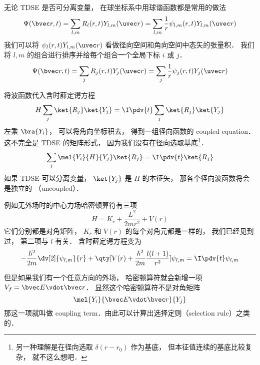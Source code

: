 

无论 TDSE 是否可分离变量， 在球坐标系中用球谐函数都是常用的做法
\begin{equation}\label{RYTDSE_eq1}
\Psi(\bvec r, t) = \sum_{l,m} R_l (r, t) Y_{l,m} (\uvec r) = \sum_{l,m} \frac{1}{r} \psi_{l,m} (r, t) Y_{l,m} (\uvec r)
\end{equation}
我们可以将 $\psi_l (r, t) Y_{l,m} (\uvec r)$ 看做径向空间和角向空间中态矢的张量积． 我们将 $l, m$ 的组合进行排序并给每个组合一个全局下标 $i$ 或 $j$．
\begin{equation}
\Psi(\bvec r, t) = \sum_j R_j (r, t) Y_j (\uvec r) = \sum_j \frac{1}{r} \psi_j (r, t) Y_j (\uvec r)
\end{equation}

将波函数代入含时薛定谔方程
\begin{equation}
H \sum_j\ket{R_j}\ket{Y_j} = \I \pdv{t}  \sum_j\ket{R_j}\ket{Y_j}
\end{equation}
左乘 $\bra{Y_i}$， 可以将角向坐标积去， 得到一组径向函数的 coupled equation． 这不完全是 TDSE 的矩阵形式， 因为我们没有在径向选取基底\footnote{另一种理解是在径向选取 $\delta(r - r_0)$ 作为基底， 但本征值连续的基底比较复杂， 就不这么想吧．}．
\begin{equation}
\sum_j \mel{Y_i}{H}{Y_j} \ket{R_j} = \I \pdv{t} \ket{R_j}
\end{equation}
如果 TDSE 可以分离变量， $\ket{Y_j}$ 是 $H$ 的本征矢， 那各个径向波函数将会是独立的 （uncoupled）．

例如无外场时的中心力场哈密顿算符有三项
\begin{equation}
H = K_r + \frac{L^2}{2mr^2} + V(r)
\end{equation}
它们分别都是对角矩阵， $K_r$ 和 $V(r)$ 的每个对角元都是一样的， 我们已经见到过， 第二项与 $l$ 有关． 含时薛定谔方程变为
\begin{equation}
-\frac{\hbar^2}{2m} \dv[2]{\psi_{l,m}}{r} + \qty[V(r) + \frac{\hbar^2}{2m}\frac{l(l + 1)}{r^2}]\psi_{l,m} = \I \pdv{t} \psi_{l,m}
\end{equation}

但是如果我们有一个任意方向的外场， 哈密顿算符就会新增一项 $V_f = \bvec E \vdot \bvec r$． 显然这个哈密顿算符不是对角矩阵
\begin{equation}
\mel{Y_i}{\bvec E \vdot \bvec r}{Y_j}
\end{equation}
那这一项就叫做 coupling term．由此可以计算出选择定则（selection rule）之类的．
